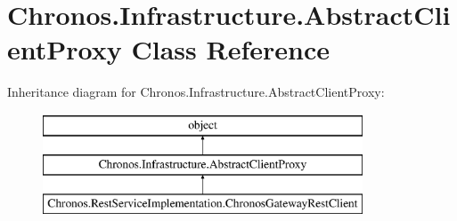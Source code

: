 \hypertarget{classChronos_1_1Infrastructure_1_1AbstractClientProxy}{}\section{Chronos.\+Infrastructure.\+Abstract\+Client\+Proxy Class Reference}
\label{classChronos_1_1Infrastructure_1_1AbstractClientProxy}
Inheritance diagram for Chronos.\+Infrastructure.\+Abstract\+Client\+Proxy\+:\begin{figure}[H]
\begin{center}
\leavevmode
\includegraphics[height=3.000000cm]{classChronos_1_1Infrastructure_1_1AbstractClientProxy}
\end{center}
\end{figure}
